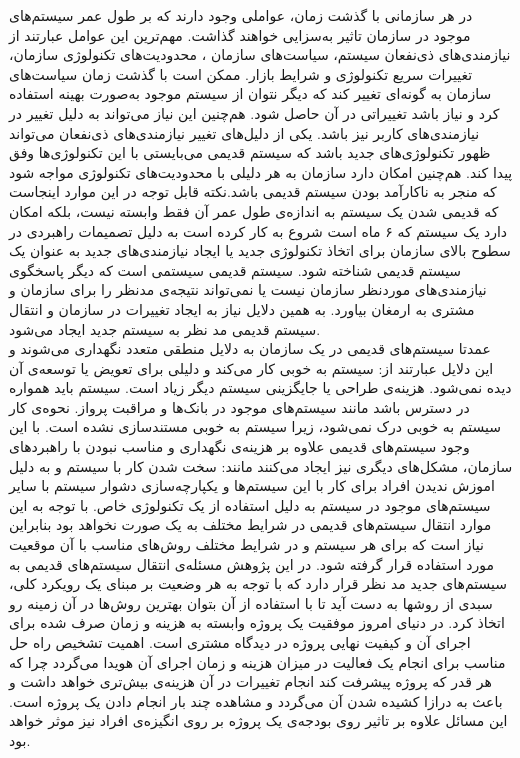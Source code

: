 
در هر سازمانی با گذشت زمان، عواملی وجود دارند که بر طول عمر سیستم‌های موجود در سازمان تاثیر به‌سزایی خواهند گذاشت. مهم‌ترین این عوامل عبارتند از نیازمندی‌های ذی‌نفعان سیستم، سیاست‌های سازمان ، محدودیت‌های تکنولوژی سازمان، تغییرات سریع تکنولوژی و شرایط بازار. ممکن است با گذشت زمان سیاست‌های سازمان به گونه‌ای تغییر کند که دیگر نتوان از سیستم موجود به‌صورت بهینه استفاده کرد و نیاز باشد تغییراتی در آن حاصل شود. هم‌چنین این نیاز می‌تواند به دلیل تغییر در نیازمندی‌های کاربر نیز باشد. یکی از دلیل‌های تغییر نیازمندی‌های ذی‌نفعان می‌تواند ظهور تکنولوژی‌‌های جدید باشد که سیستم قدیمی می‌بایستی با این تکنولوژی‌ها وفق پیدا کند. هم‌چنین امکان دارد سازمان به هر دلیلی با محدودیت‌های تکنولوژی مواجه شود که منجر به ناکارآمد بودن سیستم قدیمی باشد.نکته قابل توجه در این موارد اینجاست که قدیمی شدن یک سیستم به اندازه‌ی طول عمر آن فقط وابسته نیست، بلکه امکان دارد یک سیستم که ۶ ماه است شروع به کار کرده است به دلیل تصمیمات راهبردی در سطوح بالای سازمان برای اتخاذ تکنولوژی جدید یا ایجاد نیازمندی‌های جدید به عنوان یک سیستم قدیمی شناخته شود. سیستم قدیمی سیستمی است که دیگر پاسخگوی نیازمندی‌های موردنظر سازمان نیست یا نمی‌تواند نتیجه‌ی مدنظر را برای سازمان و مشتری به ارمغان بیاورد. به همین دلایل نیاز به ایجاد تغییرات در سازمان و انتقال سیستم قدیمی مد نظر به سیستم جدید ایجاد می‌شود.
\\
عمدتا سیستم‌های قدیمی در یک سازمان به دلایل منطقی متعدد نگهداری می‌شوند و این دلایل عبارتند از:
 سیستم به خوبی کار می‌کند و دلیلی برای تعویض یا  توسعه‌ی آن دیده نمی‌شود.
 هزینه‌ی طراحی یا جایگزینی سیستم دیگر زیاد است.
 سیستم باید همواره در دسترس باشد مانند سیستم‌های موجود در بانک‌ها و مراقبت پرواز.
 نحوه‌ی کار سیستم به خوبی درک نمی‌شود، زیرا سیستم به خوبی مستندسازی نشده است. 
با این وجود سیستم‌های قدیمی علاوه بر هزینه‌ی نگهداری و مناسب نبودن با راهبردهای سازمان، مشکل‌های دیگری نیز ایجاد می‌کنند مانند:
سخت شدن کار با سیستم و به دلیل اموزش ندیدن افراد برای کار با این 
سیستم‌ها و یکپارچه‌سازی دشوار سیستم با سایر سیستم‌های موجود در سیستم به دلیل استفاده از یک  تکنولوژی خاص.
با توجه به این موارد انتقال سیستم‌های قدیمی در شرایط مختلف به یک صورت نخواهد بود بنابراین نیاز است که برای هر سیستم و در شرایط مختلف روش‌های  مناسب با آن موقعیت مورد استفاده قرار گرفته شود. در این پژوهش مسئله‌ی انتقال سیستم‌های قدیمی به سیستم‌های جدید مد نظر قرار دارد که با توجه به هر وضعیت بر مبنای یک رویکرد کلی، سبدی از روشها به دست آید تا با استفاده از آن بتوان بهترین روش‌ها در آن زمینه رو اتخاذ کرد.
در دنیای امروز موفقیت یک پروژه وابسته به هزینه و زمان صرف شده برای اجرای آن و کیفیت نهایی پروژه در دیدگاه مشتری است. اهمیت تشخیص راه حل مناسب برای انجام یک فعالیت در میزان هزینه و زمان اجرای آن هویدا می‌گردد چرا که هر قدر که پروژه پیشرفت کند انجام تغییرات در آن هزینه‌ی بیش‌تری خواهد داشت و باعث به درازا کشیده شدن آن می‌گردد و مشاهده چند بار انجام دادن یک پروژه است. این مسائل علاوه بر تاثیر روی بودجه‌ی یک پروژه بر روی انگیزه‌ی افراد نیز موثر خواهد بود.
